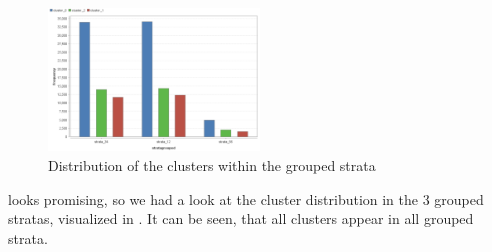\begin{figure}[!htbp]
\centering
\includegraphics[width=0.5\textwidth]{ClusterOrigRapidDistribution2Cluster.PNG}
\caption{Distribution of the clusters within the grouped strata}
\label{fig:Groupdist}
\end{figure}

 looks promising, so we had a look at the cluster distribution in the 3 grouped stratas, visualized in . It can be seen, that all clusters appear in all grouped strata. 

